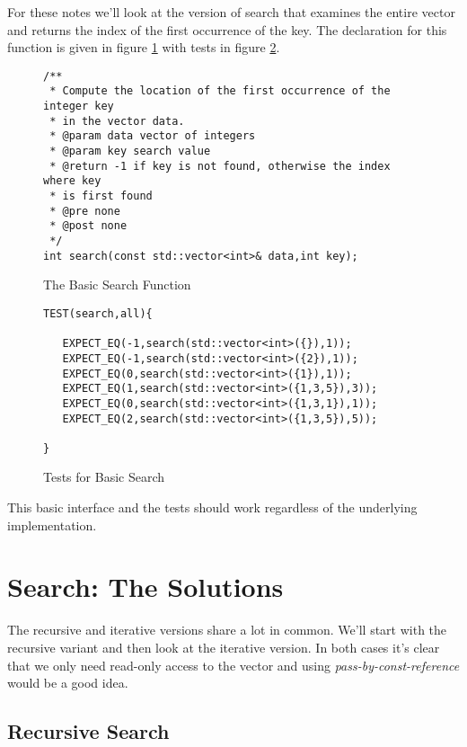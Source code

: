 \documentclass[]{tufte-handout}
\begin{document}
For these notes we'll look at the version of search that examines the entire vector and returns the index of the first occurrence 
of the key. The declaration for this function is given in figure \ref{code:searchdecl} with tests in figure \ref{code:searchtests}.

\begin{figure}[!htpb]
\begin{lstlisting}
/**
 * Compute the location of the first occurrence of the integer key
 * in the vector data.
 * @param data vector of integers
 * @param key search value
 * @return -1 if key is not found, otherwise the index where key
 * is first found
 * @pre none
 * @post none
 */
int search(const std::vector<int>& data,int key);
\end{lstlisting}
\label{code:searchdecl}
\caption{The Basic Search Function}
\end{figure}

\begin{figure}[htpb!]
\begin{lstlisting}
TEST(search,all){

   EXPECT_EQ(-1,search(std::vector<int>({}),1));
   EXPECT_EQ(-1,search(std::vector<int>({2}),1));
   EXPECT_EQ(0,search(std::vector<int>({1}),1));
   EXPECT_EQ(1,search(std::vector<int>({1,3,5}),3));
   EXPECT_EQ(0,search(std::vector<int>({1,3,1}),1));
   EXPECT_EQ(2,search(std::vector<int>({1,3,5}),5));

}
\end{lstlisting}
\label{code:searchtests}
\caption{Tests for Basic Search}
\end{figure}

This basic interface and the tests should work regardless of the underlying implementation.  

\section{Search: The Solutions}

The recursive and iterative versions share a lot in common. We'll start with the recursive variant and then look at the iterative version. In both cases it's clear that we only need read-only access to the vector and using \textit{pass-by-const-reference} would be a good idea.

\subsection{Recursive Search}
\end{document}
